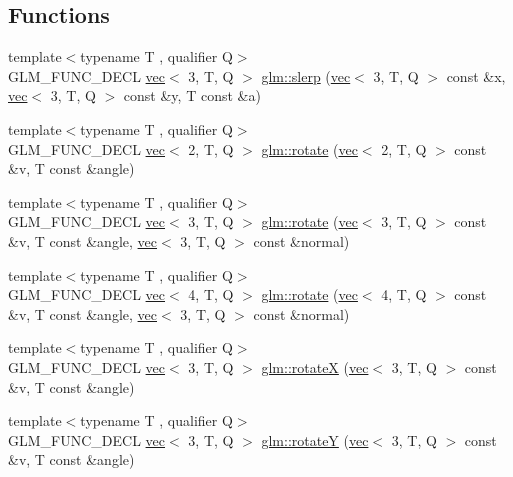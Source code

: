 \subsection*{Functions}
\begin{DoxyCompactItemize}
\item 
{\footnotesize template$<$typename T , qualifier Q$>$ }\\G\+L\+M\+\_\+\+F\+U\+N\+C\+\_\+\+D\+E\+CL \hyperlink{structglm_1_1vec}{vec}$<$ 3, T, Q $>$ \hyperlink{group__gtx__rotate__vector_ga8b11b18ce824174ea1a5a69ea14e2cee}{glm\+::slerp} (\hyperlink{structglm_1_1vec}{vec}$<$ 3, T, Q $>$ const \&x, \hyperlink{structglm_1_1vec}{vec}$<$ 3, T, Q $>$ const \&y, T const \&a)
\item 
{\footnotesize template$<$typename T , qualifier Q$>$ }\\G\+L\+M\+\_\+\+F\+U\+N\+C\+\_\+\+D\+E\+CL \hyperlink{structglm_1_1vec}{vec}$<$ 2, T, Q $>$ \hyperlink{group__gtx__rotate__vector_gab64a67b52ff4f86c3ba16595a5a25af6}{glm\+::rotate} (\hyperlink{structglm_1_1vec}{vec}$<$ 2, T, Q $>$ const \&v, T const \&angle)
\item 
{\footnotesize template$<$typename T , qualifier Q$>$ }\\G\+L\+M\+\_\+\+F\+U\+N\+C\+\_\+\+D\+E\+CL \hyperlink{structglm_1_1vec}{vec}$<$ 3, T, Q $>$ \hyperlink{group__gtx__rotate__vector_ga1ba501ef83d1a009a17ac774cc560f21}{glm\+::rotate} (\hyperlink{structglm_1_1vec}{vec}$<$ 3, T, Q $>$ const \&v, T const \&angle, \hyperlink{structglm_1_1vec}{vec}$<$ 3, T, Q $>$ const \&normal)
\item 
{\footnotesize template$<$typename T , qualifier Q$>$ }\\G\+L\+M\+\_\+\+F\+U\+N\+C\+\_\+\+D\+E\+CL \hyperlink{structglm_1_1vec}{vec}$<$ 4, T, Q $>$ \hyperlink{group__gtx__rotate__vector_ga1005f1267ed9c57faa3f24cf6873b961}{glm\+::rotate} (\hyperlink{structglm_1_1vec}{vec}$<$ 4, T, Q $>$ const \&v, T const \&angle, \hyperlink{structglm_1_1vec}{vec}$<$ 3, T, Q $>$ const \&normal)
\item 
{\footnotesize template$<$typename T , qualifier Q$>$ }\\G\+L\+M\+\_\+\+F\+U\+N\+C\+\_\+\+D\+E\+CL \hyperlink{structglm_1_1vec}{vec}$<$ 3, T, Q $>$ \hyperlink{group__gtx__rotate__vector_ga059fdbdba4cca35cdff172a9d0d0afc9}{glm\+::rotateX} (\hyperlink{structglm_1_1vec}{vec}$<$ 3, T, Q $>$ const \&v, T const \&angle)
\item 
{\footnotesize template$<$typename T , qualifier Q$>$ }\\G\+L\+M\+\_\+\+F\+U\+N\+C\+\_\+\+D\+E\+CL \hyperlink{structglm_1_1vec}{vec}$<$ 3, T, Q $>$ \hyperlink{group__gtx__rotate__vector_gaebdc8b054ace27d9f62e054531c6f44d}{glm\+::rotateY} (\hyperlink{structglm_1_1vec}{vec}$<$ 3, T, Q $>$ const \&v, T const \&angle)

\end{DoxyCompactItemize}
